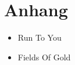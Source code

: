\chapter*{Anhang}
\label{chap:Anhang}

\begin{itemize}
  \item Run To You
  \item Fields Of Gold
\end{itemize}


\label{appendix:Run To You}


\label{appendix:Fields Of Gold} 
